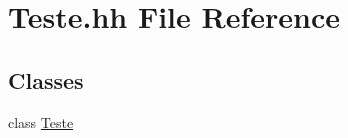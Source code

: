 \hypertarget{_teste_8hh}{\section{Teste.\-hh File Reference}
\label{_teste_8hh}
}
\subsection*{Classes}
\begin{DoxyCompactItemize}
\item 
class \hyperlink{class_teste}{Teste}
\end{DoxyCompactItemize}
